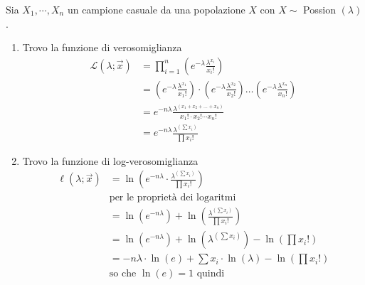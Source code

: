 \documentclass{article}  %
\theoremstyle{definition}
\begin{document}
\begin{esempio}
	Sia $X_1,\cdots, X_n$ un campione casuale da una popolazione $X$ con $X \sim$ Possion $(\lambda)$.
	\begin{enumerate}
		\item Trovo la funzione di verosomiglianza
		      \begin{align*}
			      \mathscr{L}(\lambda; \vec{x}) & = \prod_{i=1}^{n}\left(e^{-\lambda}\frac{\lambda^{x_i}}{x_i!}\right)                                                                                                      \\
			                                    & = \left(e^{-\lambda}\frac{\lambda^{x_1}}{x_1!}\right) \cdot \left(e^{-\lambda}\frac{\lambda^{x_2}}{x_2!}\right) \dots \left(e^{-\lambda}\frac{\lambda^{x_n}}{x_n!}\right) \\
			                                    & = e^{-n\lambda}\frac{\lambda^{(x_1+x_2+\dots+x_n)}}{x_1! \cdot x_2! \cdots x_n!}                                                                                          \\
			                                    & = e^{-n\lambda}\frac{\lambda^{\left(\sum x_i\right)}}{\prod x_i!}
		      \end{align*}
		\item Trovo la funzione di log-verosomiglianza
		      \begin{align*}
			      \ell(\lambda; \vec{x}) & = \ln\left(e^{-n\lambda} \cdot \frac{\lambda^{\left(\sum x_i\right)}}{\prod x_i!}\right)                       \\
			                             & \text{per le proprietà dei logaritmi}                                                                          \\
			                             & = \ln\left(e^{-n\lambda}\right) + \ln\left(\frac{\lambda^{\left(\sum x_i\right)}}{\prod x_i!}\right)           \\
			                             & = \ln\left(e^{-n\lambda}\right) + \ln\left(\lambda^{\left(\sum x_i\right)}\right) - \ln\left(\prod x_i!\right) \\
			                             & = -n \lambda \cdot \ln(e) + \sum x_i \cdot \ln(\lambda) - \ln \left(\prod x_i! \right)                         \\
			                             & \text{so che } \ln(e)=1 \text{ quindi}                                                                         \\

\end{align*}
\end{enumerate}
\end{esempio}
\end{document}
